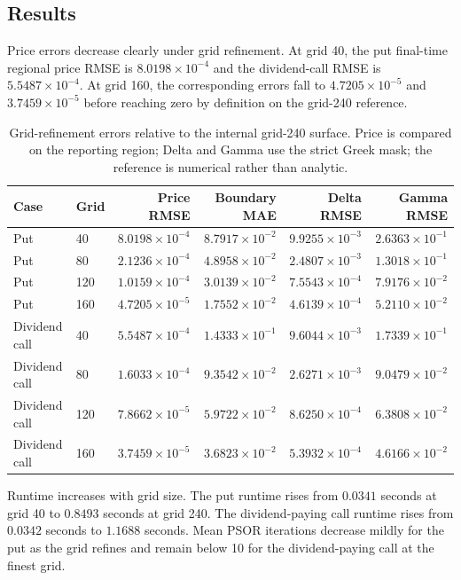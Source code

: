 \documentclass[11pt]{article}
\begin{document}
\subsection{Results}
Price errors decrease clearly under grid refinement. At grid 40, the put final-time regional price RMSE is $8.0198\times10^{-4}$ and the dividend-call RMSE is $5.5487\times10^{-4}$. At grid 160, the corresponding errors fall to $4.7205\times10^{-5}$ and $3.7459\times10^{-5}$ before reaching zero by definition on the grid-240 reference.

\begin{table}[h]
\centering
\begin{tabular}{llrrrr}
\toprule
Case & Grid & Price RMSE & Boundary MAE & Delta RMSE & Gamma RMSE\\
\midrule
Put & 40 & $8.0198\times10^{-4}$ & $8.7917\times10^{-2}$ & $9.9255\times10^{-3}$ & $2.6363\times10^{-1}$\\
Put & 80 & $2.1236\times10^{-4}$ & $4.8958\times10^{-2}$ & $2.4807\times10^{-3}$ & $1.3018\times10^{-1}$\\
Put & 120 & $1.0159\times10^{-4}$ & $3.0139\times10^{-2}$ & $7.5543\times10^{-4}$ & $7.9176\times10^{-2}$\\
Put & 160 & $4.7205\times10^{-5}$ & $1.7552\times10^{-2}$ & $4.6139\times10^{-4}$ & $5.2110\times10^{-2}$\\
Dividend call & 40 & $5.5487\times10^{-4}$ & $1.4333\times10^{-1}$ & $9.6044\times10^{-3}$ & $1.7339\times10^{-1}$\\
Dividend call & 80 & $1.6033\times10^{-4}$ & $9.3542\times10^{-2}$ & $2.6271\times10^{-3}$ & $9.0479\times10^{-2}$\\
Dividend call & 120 & $7.8662\times10^{-5}$ & $5.9722\times10^{-2}$ & $8.6250\times10^{-4}$ & $6.3808\times10^{-2}$\\
Dividend call & 160 & $3.7459\times10^{-5}$ & $3.6823\times10^{-2}$ & $5.3932\times10^{-4}$ & $4.6166\times10^{-2}$\\
\bottomrule
\end{tabular}
\caption{Grid-refinement errors relative to the internal grid-240 surface. Price is compared on the reporting region; Delta and Gamma use the strict Greek mask; the reference is numerical rather than analytic.}
\end{table}

Runtime increases with grid size. The put runtime rises from $0.0341$ seconds at grid 40 to $0.8493$ seconds at grid 240. The dividend-paying call runtime rises from $0.0342$ seconds to $1.1688$ seconds. Mean PSOR iterations decrease mildly for the put as the grid refines and remain below 10 for the dividend-paying call at the finest grid.
\end{document}
